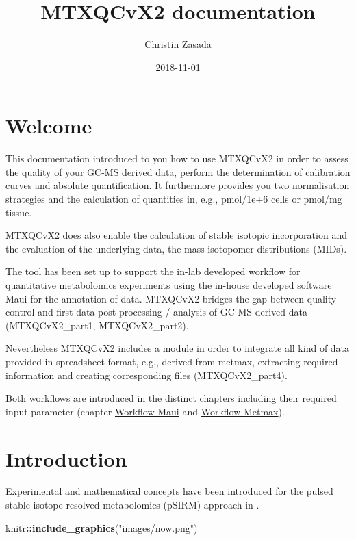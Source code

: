 \documentclass[]{book}
\title{MTXQCvX2 documentation}
\author{Christin Zasada}
\date{2018-11-01}
\newenvironment{Shaded}{\begin{snugshade}}{\end{snugshade}}
\newcommand{\KeywordTok}[1]{\textcolor[rgb]{0.13,0.29,0.53}{\textbf{#1}}}
\newcommand{\StringTok}[1]{\textcolor[rgb]{0.31,0.60,0.02}{#1}}
\newcommand{\OperatorTok}[1]{\textcolor[rgb]{0.81,0.36,0.00}{\textbf{#1}}}
\newcommand{\NormalTok}[1]{#1}
\theoremstyle{definition}
\theoremstyle{definition}
\theoremstyle{definition}
\theoremstyle{remark}
\begin{document}
\maketitle

{
\setcounter{tocdepth}{1}
\tableofcontents
}
\chapter{Welcome}\label{welcome}

This documentation introduced to you how to use MTXQCvX2 in order to
assess the quality of your GC-MS derived data, perform the determination
of calibration curves and absolute quantification. It furthermore
provides you two normalisation strategies and the calculation of
quantities in, e.g., pmol/1e+6 cells or pmol/mg tissue.

MTXQCvX2 does also enable the calculation of stable isotopic
incorporation and the evaluation of the underlying data, the mass
isotopomer distributions (MIDs).

The tool has been set up to support the in-lab developed workflow for
quantitative metabolomics experiments using the in-house developed
software Maui for the annotation of data. MTXQCvX2 bridges the gap
between quality control and first data post-processing / analysis of
GC-MS derived data (MTXQCvX2\_part1, MTXQCvX2\_part2).

Nevertheless MTXQCvX2 includes a module in order to integrate all kind
of data provided in spreadsheet-format, e.g., derived from metmax,
extracting required information and creating corresponding files
(MTXQCvX2\_part4).

Both workflows are introduced in the distinct chapters including their
required input parameter (chapter \protect\hyperlink{wf:maui}{Workflow
Maui} and \protect\hyperlink{wf:metmax}{Workflow Metmax}).

\chapter{Introduction}\label{intro}

Experimental and mathematical concepts have been introduced for the
pulsed stable isotope resolved metabolomics (pSIRM) approach in
\citep{Pietzke2014}.

\begin{Shaded}
\begin{Highlighting}[]
\NormalTok{knitr}\OperatorTok{::}\KeywordTok{include_graphics}\NormalTok{(}\StringTok{"images/now.png"}\NormalTok{)}
\end{Highlighting}
\end{Shaded}
\end{document}
